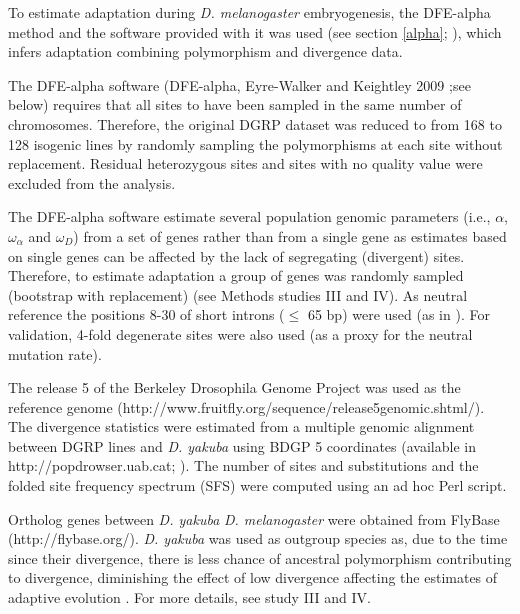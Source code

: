 
To estimate adaptation during \textit{D. melanogaster} embryogenesis, the DFE-alpha method and the software provided with it was used (see section \ref{alpha}; \citealp{Eyre-Walker2009}), which infers adaptation combining polymorphism and divergence data.

The DFE-alpha software (DFE-alpha, Eyre-Walker and Keightley 2009 ;see below) requires that all sites to have been sampled in the same number of chromosomes. Therefore, the original DGRP dataset was reduced to from 168 to 128 isogenic lines by randomly sampling the polymorphisms at each site without replacement. Residual heterozygous sites and sites with no quality value were excluded from the analysis.

The DFE-alpha software estimate several population genomic parameters (i.e., $\alpha$, $\omega_{\alpha}$ and $\omega_{D}$) from a set of genes rather than from a single gene as estimates based on single genes can be affected by the lack of segregating (divergent) sites. Therefore, to estimate adaptation a group of genes was randomly sampled (bootstrap with replacement) (see Methods studies III and IV). 
As neutral reference the positions 8-30 of short introns ($\leq$ 65 bp) were used (as in \citealp{Heyn2014}). For validation, 4-fold degenerate sites were also used (as a proxy for the neutral mutation rate).

The release 5 of the Berkeley Drosophila Genome Project was used as the reference genome (http://www.fruitfly.org/sequence/release5genomic.shtml/). The divergence statistics were estimated from a multiple genomic alignment between DGRP lines and \textit{D. yakuba} using BDGP 5 coordinates (available in http://popdrowser.uab.cat; \citealp{Ramia2012}).
The number of sites and substitutions and the folded site frequency spectrum (SFS) were computed using an ad hoc Perl script.

Ortholog genes between \textit{D. yakuba} \textit{D. melanogaster} were obtained from FlyBase (http://flybase.org/). \textit{D. yakuba} was used as outgroup species as, due to the time since their divergence, there is less chance of ancestral polymorphism contributing to divergence, diminishing the effect of low divergence affecting the estimates of adaptive evolution \citep{Keightley2012}. For more details, see study III and IV.